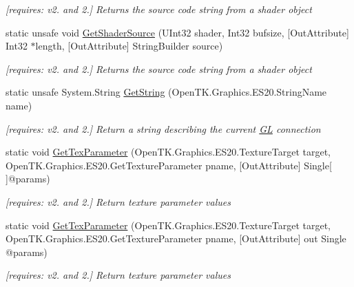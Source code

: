\begin{DoxyCompactItemize}
\begin{DoxyCompactList}\small\item\em \mbox{[}requires\-: v2. and 2.\mbox{]} Returns the source code string from a shader object \end{DoxyCompactList}\item 
static unsafe void \hyperlink{class_open_t_k_1_1_graphics_1_1_e_s20_1_1_g_l_ad5c7916d226182bb5865d13105770a76}{Get\-Shader\-Source} (U\-Int32 shader, Int32 bufsize, \mbox{[}Out\-Attribute\mbox{]} Int32 $\ast$length, \mbox{[}Out\-Attribute\mbox{]} String\-Builder source)
\begin{DoxyCompactList}\small\item\em \mbox{[}requires\-: v2. and 2.\mbox{]} Returns the source code string from a shader object \end{DoxyCompactList}\item 
static unsafe System.\-String \hyperlink{class_open_t_k_1_1_graphics_1_1_e_s20_1_1_g_l_a67dd0c3bca370ebb63042fa8ce32d3b7}{Get\-String} (Open\-T\-K.\-Graphics.\-E\-S20.\-String\-Name name)
\begin{DoxyCompactList}\small\item\em \mbox{[}requires\-: v2. and 2.\mbox{]} Return a string describing the current \hyperlink{class_open_t_k_1_1_graphics_1_1_e_s20_1_1_g_l}{G\-L} connection \end{DoxyCompactList}\item 
static void \hyperlink{class_open_t_k_1_1_graphics_1_1_e_s20_1_1_g_l_a270cf8b9a8cb06053377021f5d33eb39}{Get\-Tex\-Parameter} (Open\-T\-K.\-Graphics.\-E\-S20.\-Texture\-Target target, Open\-T\-K.\-Graphics.\-E\-S20.\-Get\-Texture\-Parameter pname, \mbox{[}Out\-Attribute\mbox{]} Single\mbox{[}$\,$\mbox{]}@params)
\begin{DoxyCompactList}\small\item\em \mbox{[}requires\-: v2. and 2.\mbox{]} Return texture parameter values \end{DoxyCompactList}\item 
static void \hyperlink{class_open_t_k_1_1_graphics_1_1_e_s20_1_1_g_l_aea02cd77c2a8418c49dea8ac26a4b05a}{Get\-Tex\-Parameter} (Open\-T\-K.\-Graphics.\-E\-S20.\-Texture\-Target target, Open\-T\-K.\-Graphics.\-E\-S20.\-Get\-Texture\-Parameter pname, \mbox{[}Out\-Attribute\mbox{]} out Single @params)
\begin{DoxyCompactList}\small\item\em \mbox{[}requires\-: v2. and 2.\mbox{]} Return texture parameter values \end{DoxyCompactList}\item 

\end{DoxyCompactItemize}
